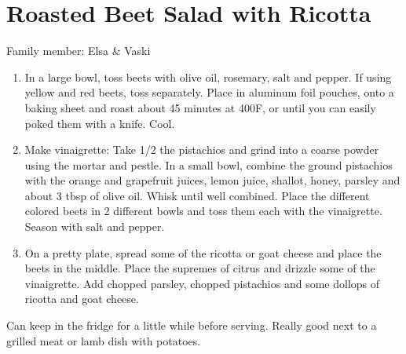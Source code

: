\chapter{Roasted Beet Salad with Ricotta}
\label{ch:roasted-beet-salad}


Family member: Elsa \& Vaski

\begin{enumerate}
    \item In a large bowl, toss beets with olive oil, rosemary, salt and pepper. If using yellow and red beets, toss separately. Place in aluminum foil pouches, onto a baking sheet and roast about 45 minutes at 400\degree F, or until you can easily poked them with a knife. Cool.
    \item Make vinaigrette: Take 1/2 the pistachios and grind into a coarse powder using the mortar and pestle. In a small bowl, combine the ground pistachios with the orange and grapefruit juices, lemon juice, shallot, honey, parsley and about 3 tbsp of olive oil. Whisk until well combined. Place the different colored beets in 2 different bowls and toss them each with the vinaigrette. Season with salt and pepper.
    \item On a pretty plate, spread some of the ricotta or goat cheese and place the beets in the middle. Place the supremes of citrus and drizzle some of the vinaigrette. Add chopped parsley, chopped pistachios and some dollops of ricotta and goat cheese.
\end{enumerate}

Can keep in the fridge for a little while before serving.
Really good next to a grilled meat or lamb dish with potatoes.

